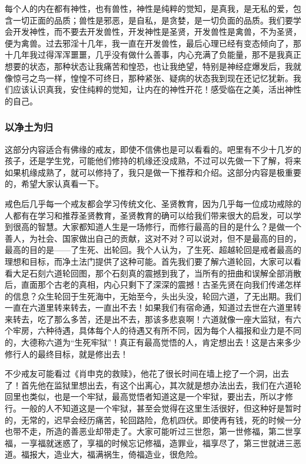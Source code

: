 每个人的内在都有神性，也有兽性，神性是纯粹的觉知，是真我，是无私的爱，包含一切正面的品质；兽性是邪恶，是自私，是贪婪，是一切负面的品质。我们要学会开发神性，而不要去开发兽性，开发神性是圣贤，开发兽性是禽兽，不为圣贤，便为禽兽。过去邪淫十几年，我一直在开发兽性，最后心理已经有变态倾向了，那十几年我过得浑浑噩噩，几乎没有做什么善事，内心充满了负能量，那不是我真正想要的状态，那种状态让我痛苦和惶恐，也让我绝望，特别是神经症爆发后，我就像惊弓之鸟一样，惶惶不可终日，那种紧张、疑病的状态我到现在还记忆犹新。我们应该认识真我，安住纯粹的觉知，让内在的神性开花！感受临在之美，活出神性的自己。

\subsubsection{以净土为归}

这部分内容适合有佛缘的戒友，即使不信佛也是可以看看的。吧里有不少十几岁的孩子，还是学生党，可能他们修持的机缘还没成熟，不过可以先做一下了解，将来如果机缘成熟了，就可以修持了，我只是做一下推荐和介绍。这部分内容是极重要的，希望大家认真看一下。

戒色后几乎每一个戒友都会学习传统文化、圣贤教育，因为几乎每一位成功戒除的人都有在学习和推荐圣贤教育，圣贤教育的确可以给我们带来很大的启发，可以学到很高的智慧。大家都知道人生是一场修行，而修行最高的目的是什么？是做一个善人，为社会、国家做出自己的贡献，这对不对？可以说对，但不是最高的目的，最高的目的是——了生死、出轮回。我个人认为，了生死、超越轮回是戒者最高的理想和目标，而净土法门提供了这种可能。首先我们要了解六道轮回，大家可以看看大足石刻六道轮回图，那个石刻真的震撼到我了，当所有的扭曲和误解全部消散后，直面那个古老的真相，内心只剩下了深深的震撼！古圣先贤在向我们传递怎样的信息？众生轮回于生死海中，无始至今，头出头没，轮回六道，了无出期。我们一直在六道里转来转去，一直出不去！如果我们有宿命通，知道过去世在六道里转来转去，吃了那么多苦，还是出不去，那该多悲哀啊！六道就像一座大监狱，有六个牢房，六种待遇，具体每个人的待遇又有所不同，因为每个人福报和业力是不同的，大德称六道为“生死牢狱”！真正有最高觉悟的人，肯定想出去！这是古来多少修行人的最终目标，就是修出去！

不少戒友可能看过《肖申克的救赎》，他花了很长时间在墙上挖了一个洞，出去了！首先他在监狱里想出去，有这个出离心，其次就是想办法出去，我们在六道轮回里也类似，也是一个牢狱，最高觉悟者知道这是一个牢狱，要出去，所以才修行。一般的人不知道这是一个牢狱，甚至会觉得在这里生活很好，但这种好是暂时的，无常的，迟早会经历痛苦，轮回路险，危机四伏。即使再有钱，死的时候一分也带不走，所造的善恶业却带走了。大家可能听过三世怨，第一世修福，第二世享福，一享福就迷惑了，享福的时候忘记修福，造罪业，福享尽了，第三世就进三恶道。福报大，造业大，福满祸生，倚福造业，很危险。

